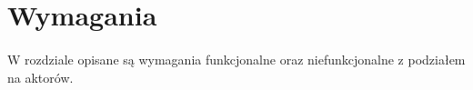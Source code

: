 \documentclass{article}
\begin{document}
\begin{itemize}


	\end{itemize}
	\section{Wymagania}
	\paragraph{} W rozdziale opisane są wymagania funkcjonalne oraz niefunkcjonalne z podziałem na aktorów.
\end{document}
